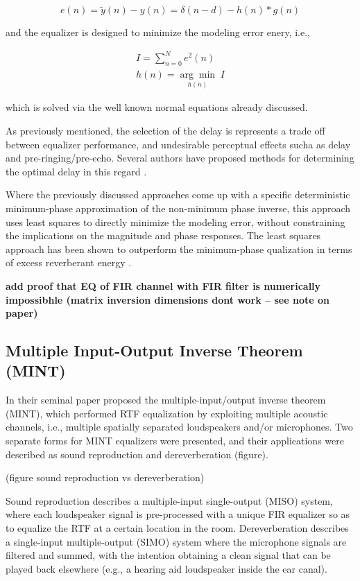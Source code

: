 \begin{equation}
	e(n) = \tilde{y}(n)  - y(n) = \delta(n-d) - h(n)*g(n)
\end{equation}

\noindent
and the equalizer is designed to minimize the modeling error enery, i.e.,

\begin{eqnarray}
I = \sum_{n=0}^{N}e^2(n) \\
h(n) = \underset{h(n)}{\arg\min}\;I
\end{eqnarray}

\noindent
which is solved via the well known normal equations already discussed.

As previously mentioned, the selection of the delay is represents a trade off between equalizer performance, and undesirable perceptual effects sucha as delay and pre-ringing/pre-echo. Several authors have proposed methods for determining the optimal delay in this regard \citep{clarkson1985spectral, ford1978optimum}.

Where the previously discussed approaches come up with a specific deterministic minimum-phase approximation of the non-minimum phase inverse, this approach uses least squares to directly minimize the modeling error, without constraining the implications on the magnitude and phase responses. The least squares approach has been shown to outperform the minimum-phase qualization in terms of excess reverberant energy \citep{mourjopoulos1982comparative}.

\textbf{add proof that EQ of FIR channel with FIR filter is numerically impossibhle (matrix inversion dimensions dont work -- see note on paper)}

\subsection{Multiple Input-Output Inverse Theorem (MINT)}

In their seminal paper \cite{miyoshi1986inverse} proposed the multiple-input/output inverse theorem (MINT), which performed RTF equalization by exploiting multiple acoustic channels, i.e., multiple spatially separated loudspeakers and/or microphones. Two separate forms for MINT equalizers were presented, and their applications were described as sound reproduction and dereverberation (figure).

(figure sound reproduction vs dereverberation)

Sound reproduction describes a multiple-input single-output (MISO) system, where each loudspeaker signal is pre-processed with a unique FIR equalizer so as to equalize the RTF at a certain location in the room. Dereverberation describes a single-input multiple-output (SIMO) system where the microphone signals are filtered and summed, with the intention obtaining a clean signal that can be played back elsewhere (e.g., a hearing aid loudspeaker inside the ear canal).

